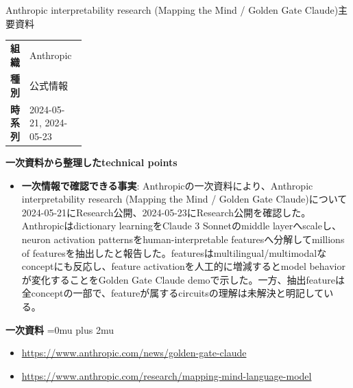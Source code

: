 \Needspace{0.38\textheight}
\begin{technicalnote}{Anthropic interpretability research (Mapping the Mind / Golden Gate Claude)}{主要資料}
\begingroup
\begin{tabularx}{\linewidth}{@{}>{\bfseries}p{0.22\linewidth}X@{}}
組織 & Anthropic \\
種別 & 公式情報 \\
時系列 & 2024-05-21, 2024-05-23 \\
\end{tabularx}
\smallskip
\begin{minipage}{\linewidth}
{\bfseries 一次資料から整理したtechnical points}
\begin{itemize}[leftmargin=1.5em,itemsep=0.35em]
\item \textbf{一次情報で確認できる事実}: Anthropicの一次資料により、Anthropic interpretability research (Mapping the Mind / Golden Gate Claude)について2024-05-21にResearch公開、2024-05-23にResearch公開を確認した。 Anthropicはdictionary learningをClaude 3 Sonnetのmiddle layerへscaleし、neuron activation patternsをhuman-interpretable featuresへ分解してmillions of featuresを抽出したと報告した。featuresはmultilingual/multimodalなconceptにも反応し、feature activationを人工的に増減するとmodel behaviorが変化することをGolden Gate Claude demoで示した。一方、抽出featureは全conceptの一部で、featureが属するcircuitsの理解は未解決と明記している。
\end{itemize}
\begin{minipage}{\linewidth}
\begin{samepage}
{\bfseries 一次資料}
\begingroup\sloppy
\Urlmuskip=0mu plus 2mu\relax
\begin{itemize}[leftmargin=1.5em,itemsep=0.25em]
\item {\scriptsize\url{https://www.anthropic.com/news/golden-gate-claude}}
\item {\scriptsize\url{https://www.anthropic.com/research/mapping-mind-language-model}}
\end{itemize}
\endgroup
\end{samepage}
\end{minipage}
\end{minipage}
\endgroup
\end{technicalnote}
\medskip

